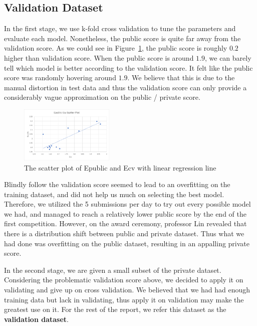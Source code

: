 \documentclass[10pt,letterpaper]{article}
\begin{document}
\subsection{Validation Dataset}

In the first stage, we use k-fold cross validation to tune the parameters and evaluate each model. Nonetheless, the public score is quite far away from the validation score. As we could see in Figure~\ref{fig:EpublicEcvScatter}, the public score is roughly $0.2$ higher than validation score. When the public score is around $1.9$, we can barely tell which model is better according to the validation score. It felt like the public score was randomly hovering around $1.9$. We believe that this is due to the manual distortion in test data and thus the validation score can only provide a considerably vague approximation on the public / private score.

\begin{figure}[h]
	\centering
	\includegraphics[width=0.4\textwidth]{Epublic-Ecv-scatter.png}
	\caption{The scatter plot of Epublic and Ecv with linear regression line}
	\label{fig:EpublicEcvScatter}
\end{figure}

Blindly follow the validation score seemed to lead to an overfitting on the training dataset, and did not help us much on selecting the best model. Therefore, we utilized the 5 submissions per day to try out every possible model we had, and managed to reach a relatively lower public score by the end of the first competition. However, on the award ceremony, professor Lin revealed that there is a distribution shift between public and private dataset. Thus what we had done was overfitting on the public dataset, resulting in an appalling private score. 

In the second stage, we are given a small subset of the private dataset. Considering the problematic validation score above, we decided to apply it on validating and give up on cross validation. We believed that we had had enough training data but lack in validating, thus apply it on validation may make the greatest use on it. For the rest of the report, we refer this dataset as the \textbf{validation dataset}.
\end{document}
